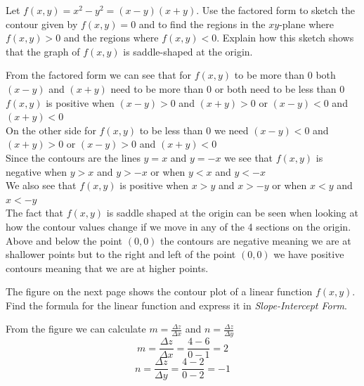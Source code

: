 \documentclass[12pt,letterpaper, onecolumn]{exam}
\begin{document}
\begin{questions}
		\question Let $f(x,y)= x^2-y^2 = (x-y)(x+y)$. Use the factored form to sketch the contour given by $f(x,y)=0$ and to find the regions in the $xy$-plane where $f(x,y)>0$ and the regions where $f(x,y)<0$. Explain how this sketch shows that the graph of $f(x,y)$ is saddle-shaped at the origin.
		\begin{solution}
			From the factored form we can see that for $f(x,y)$ to be more than 0 both $(x-y)$ and $(x+y)$ need to be more than 0 or both need to be less than 0\\
			$f(x,y)$ is positive when $(x-y)>0$ and $(x+y)>0$ or  $(x-y)<0$ and $(x+y)<0$\\
			On the other side for $f(x,y)$ to be less than 0 we need $(x-y)<0$ and $(x+y)>0$ or  $(x-y)>0$ and $(x+y)<0$\\
			Since the contours are the lines $y=x$ and $y=-x$ we see that $f(x,y)$ is negative when $y>x$ and $y>-x$ or when $y<x$ and $y<-x$\\
			We also see that $f(x,y)$ is positive when $x>y$ and $x>-y$ or when $x<y$ and $x<-y$\\
			The fact that $f(x,y)$ is saddle shaped at the origin can be seen when looking at how the contour values change if we move in any of the 4 sections on the origin. Above and below the point $(0,0)$ the contours are negative meaning we are at shallower points but to the right and left of the point $(0,0)$ we have positive contours meaning that we are at higher points.\\
		\end{solution}
		
		\question The figure on the next page shows the contour plot of a linear function $f(x,y)$. Find the formula for the linear function and express it in \textit{Slope-Intercept Form}.
		
		\begin{solution}
			From the figure we can calculate $m=\frac{\Delta z}{\Delta x}$ and $n = \frac{\Delta z}{\Delta y}$
			$$m=\frac{\Delta z}{\Delta x}=\frac{4-6}{0-1}=2$$
			$$n=\frac{\Delta z}{\Delta y}=\frac{4-2}{0-2}=-1$$
			

\end{solution}
\end{questions}
\end{document}
